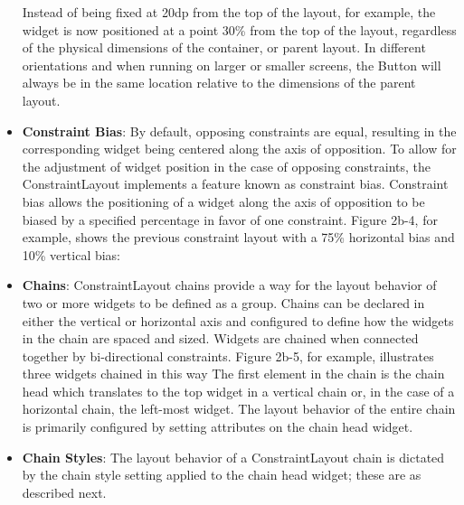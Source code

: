 \documentclass{report}
\begin{document}
\begin{itemize}
            \bigbreak \noindent 
            \bigbreak \noindent 
            Instead of being fixed at 20dp from the top of the layout, for example, the widget is now positioned at a point 30\% from the top of the layout, regardless of the physical dimensions of the container, or parent layout.
            \bigbreak \noindent 
            In different orientations and when running on larger or smaller screens, the Button will always be in the same location relative to the dimensions of the parent layout.
        \item \textbf{Constraint Bias}: By default, opposing constraints are equal, resulting in the corresponding widget being centered along the axis of opposition. 
            \bigbreak \noindent 
            To allow for the adjustment of widget position in the case of opposing constraints, the ConstraintLayout implements a feature known as constraint bias. Constraint bias allows the positioning of a widget along the axis of opposition to be biased by a specified percentage in favor of one constraint.
            \bigbreak \noindent 
            \bigbreak \noindent 
            Figure 2b-4, for example, shows the previous constraint layout with a 75\% horizontal bias and 10\% vertical bias:
        \item \textbf{Chains}: ConstraintLayout chains provide a way for the layout behavior of two or more widgets to be defined as a group.
            \bigbreak \noindent 
            Chains can be declared in either the vertical or horizontal axis and configured to define how the widgets in the chain are spaced and sized. Widgets are chained when connected together by bi-directional constraints.
            \bigbreak \noindent 
            \bigbreak \noindent 
            Figure 2b-5, for example, illustrates three widgets chained in this way
            \bigbreak \noindent 
            The first element in the chain is the chain head which translates to the top widget in a vertical chain or, in the case of a horizontal chain, the left-most widget.
            \bigbreak \noindent 
            The layout behavior of the entire chain is primarily configured by setting attributes on the chain head widget.
        \item \textbf{Chain Styles}: The layout behavior of a ConstraintLayout chain is dictated by the chain style setting applied to the chain head widget; these are as described next.
            \begin{itemize}

\end{itemize}
\end{itemize}
\end{document}
